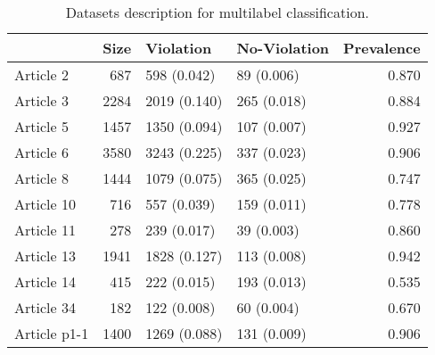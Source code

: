 \begin{table}
\centering
\caption{Datasets description for multilabel classification.}
\label{table:multilabel_datasets}
\begin{tabular}{lrllr}
\toprule
             &  Size &    Violation & No-Violation &  Prevalence \\
\midrule
   Article 2 &   687 &  598 (0.042) &   89 (0.006) &       0.870 \\
   Article 3 &  2284 & 2019 (0.140) &  265 (0.018) &       0.884 \\
   Article 5 &  1457 & 1350 (0.094) &  107 (0.007) &       0.927 \\
   Article 6 &  3580 & 3243 (0.225) &  337 (0.023) &       0.906 \\
   Article 8 &  1444 & 1079 (0.075) &  365 (0.025) &       0.747 \\
  Article 10 &   716 &  557 (0.039) &  159 (0.011) &       0.778 \\
  Article 11 &   278 &  239 (0.017) &   39 (0.003) &       0.860 \\
  Article 13 &  1941 & 1828 (0.127) &  113 (0.008) &       0.942 \\
  Article 14 &   415 &  222 (0.015) &  193 (0.013) &       0.535 \\
  Article 34 &   182 &  122 (0.008) &   60 (0.004) &       0.670 \\
Article p1-1 &  1400 & 1269 (0.088) &  131 (0.009) &       0.906 \\
\bottomrule
\end{tabular}
\end{table}
